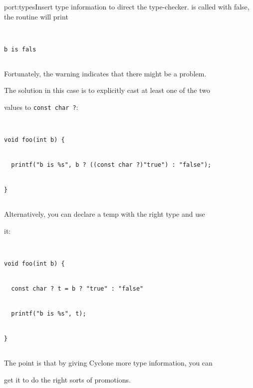 \begin{porta}{port:types}{Insert type information to direct the type-checker.}
is called with false, the routine will print


\begin{verbatim}


b is fals


\end{verbatim}


Fortunately, the warning indicates that there might be a problem.


The solution in this case is to explicitly cast at least one of the two


values to \texttt{const char ?}:


\begin{verbatim}


void foo(int b) {


  printf("b is %s", b ? ((const char ?)"true") : "false");


} 


\end{verbatim}


Alternatively, you can declare a temp with the right type and use


it:


\begin{verbatim}


void foo(int b) {


  const char ? t = b ? "true" : "false"


  printf("b is %s", t);


} 


\end{verbatim}


The point is that by giving Cyclone more type information, you can


get it to do the right sorts of promotions.  


\end{porta}





